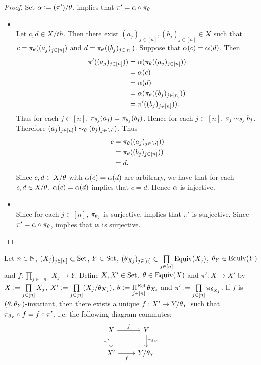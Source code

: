 \begin{proof}
	Set $\alpha \vcentcolon= (\pi')/\theta$.  implies that $\pi' = \alpha \circ \pi_{\theta}$
	\begin{itemize}
		\item {} \\ 
		Let $c, d \in X/ th$. Then there exist $(a_j)_{j \in [n]}, (b_j)_{j \in [n]} \in X$ such that $c = \pi_{\theta}((a_j)_{j \in [n]})$ and $d = \pi_{\theta}((b_j)_{j \in [n]})$. Suppose that $\alpha(c) = \alpha(d)$. Then 
		\begin{align*}
			\pi'((a_j)_{j \in [n]})) 
			& = \alpha(\pi_{\theta}((a_j)_{j \in [n]})) \\
			& = \alpha(c) \\
			& = \alpha(d) \\
			& = \alpha(\pi_{\theta}((b_j)_{j \in [n]})) \\
			& = \pi'((b_j)_{j \in [n]})).
		\end{align*}
		Thus for each $j \in [n]$, $\pi_{\theta_j}(a_j) = \pi_{\theta_j}(b_j)$. Hence for each $j \in [n]$, $a_j \sim_{\theta_j} b_j$. Therefore $(a_j)_{j \in [n]}) \sim_{\theta} (b_j)_{j \in [n]})$. Thus 
		\begin{align*}
			c
			& = \pi_{\theta}((a_j)_{j \in [n]})) \\
			& = \pi_{\theta}((b_j)_{j \in [n]})) \\
			& = d.
		\end{align*}
		Since $c, d \in X/ \theta$ with $\alpha(c) = \alpha(d)$ are arbitrary, we have that for each $c, d \in X/ \theta$, $\alpha(c) = \alpha(d)$ implies that $c = d$. Hence $\alpha$ is injective. 
		\item {} \\
		Since for each $j \in [n]$, $\pi_{\theta_j}$ is surjective,  implies that $\pi'$ is surjective. Since $\pi' = \alpha \circ \pi_{\theta}$,  implies that $\alpha$ is surjective.
	\end{itemize}
\end{proof}

\begin{ex}
	Let $n \in \mathbb{N}$, $(X_j)_{j \in [n]} \subset \text{Set}$, $Y \in \text{Set}$, $(\theta_{X_j})_{j \in [n]} \in \prod\limits_{j \in [n]} \operatorname*{\text{Equiv}}(X_j)$, $\theta_Y \in \operatorname*{\text{Equiv}}(Y)$ and $f: \prod\limits_{j \in [n]} X_j \rightarrow Y$. Define $X, X' \in \text{Set}$, $\theta \in \operatorname*{\text{Equiv}}(X)$ and $\pi':X \rightarrow X'$ by $X \vcentcolon= \prod\limits_{j \in [n]} X_j$, $X' \vcentcolon= \prod\limits_{j \in [n]} (X_j/\theta_{X_j})$, $\theta \vcentcolon= \operatorname*{\Pi^{\text{Rel}}}\limits_{j \in [n]} \theta_{X_j}$ and $\pi' \vcentcolon= \prod\limits_{j \in [n]} \pi_{\theta_{X_j}}$. If $f$ is $(\theta, \theta_Y)$-invariant, then there exists a unique $\bar{f}:X' \rightarrow Y/\theta_Y$ such that $\pi_{\theta_Y} \circ f = \bar{f} \circ \pi'$, i.e. the following diagram commutes:
	\[ 
	\begin{tikzcd}
		X  \arrow[r, "f"]  \arrow[d, "\pi'"']  & Y   \arrow[d, "\pi_{\th_Y}"]\\
		X' \arrow[r, "\bar{f}"'] &  Y / {\th_Y} \\
	\end{tikzcd}
	\]
\end{ex}

